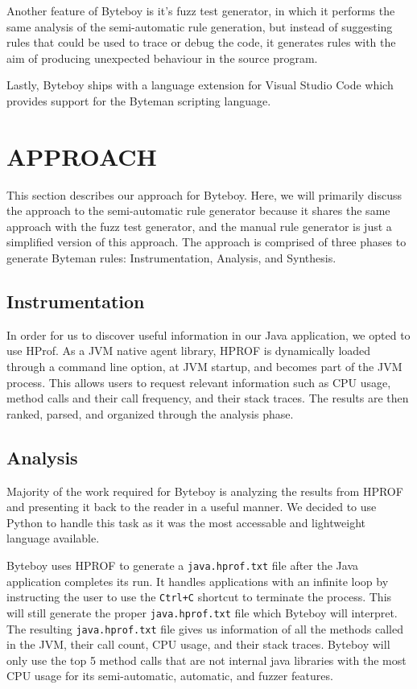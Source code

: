 \documentclass[letterpaper,twocolumn,10pt]{article}
\begin{document}
Another feature of Byteboy is it's fuzz test generator, in which it performs the same analysis of the semi-automatic rule generation, but instead of suggesting rules that could be used to trace or debug the code, it generates rules with the aim of producing unexpected behaviour in the source program.

Lastly, Byteboy ships with a language extension for Visual Studio Code which provides support for the Byteman scripting language.

\section{APPROACH}

This section describes our approach for Byteboy. Here, we will primarily discuss the approach to the semi-automatic rule generator because it shares the same approach with the fuzz test generator, and the manual rule generator is just a simplified version of this approach. The approach is comprised of three phases to generate Byteman rules: Instrumentation, Analysis, and Synthesis.

\subsection{Instrumentation}

In order for us to discover useful information in our Java application, we opted to use HProf. As a JVM native agent library, HPROF is dynamically loaded through a command line option, at JVM startup, and becomes part of the JVM process\cite{hprof}. This allows users to request relevant information such as CPU usage, method calls and their call frequency, and their stack traces. The results are then ranked, parsed, and organized through the analysis phase.  

\subsection{Analysis}

Majority of the work required for Byteboy is analyzing the results from HPROF and presenting it back to the reader in a useful manner. We decided to use Python to handle this task as it was the most accessable and lightweight language available. 

Byteboy uses HPROF to generate a {\tt java.hprof.txt} file after the Java application completes its run. It handles applications with an infinite loop by instructing the user to use the {\tt Ctrl+C} shortcut to terminate the process. This will still generate the proper {\tt java.hprof.txt} file which Byteboy will interpret. The resulting {\tt java.hprof.txt} file gives us information of all the methods called in the JVM, their call count, CPU usage, and their stack traces. Byteboy will only use the top 5 method calls that are not internal java libraries with the most CPU usage for its semi-automatic, automatic, and fuzzer features.  
\end{document}
